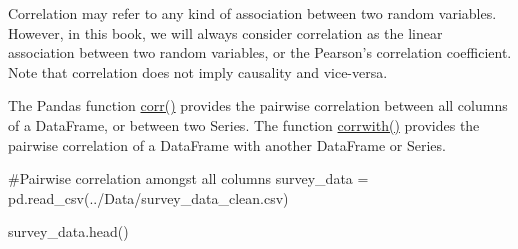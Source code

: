 \documentclass[
  letterpaper,
  DIV=11,
  numbers=noendperiod]{scrreprt}
\newenvironment{Shaded}{\begin{snugshade}}{\end{snugshade}}
\newcommand{\CommentTok}[1]{\textcolor[rgb]{0.37,0.37,0.37}{#1}}
\newcommand{\NormalTok}[1]{\textcolor[rgb]{0.00,0.23,0.31}{#1}}
\newcommand{\OperatorTok}[1]{\textcolor[rgb]{0.37,0.37,0.37}{#1}}
\newcommand{\StringTok}[1]{\textcolor[rgb]{0.13,0.47,0.30}{#1}}
\begin{document}
Correlation may refer to any kind of association between two random
variables. However, in this book, we will always consider correlation as
the linear association between two random variables, or the Pearson's
correlation coefficient. Note that correlation does not imply causality
and vice-versa.

The Pandas function
\href{https://pandas.pydata.org/docs/reference/api/pandas.DataFrame.corr.html}{corr()}
provides the pairwise correlation between all columns of a DataFrame, or
between two Series. The function
\href{https://pandas.pydata.org/docs/reference/api/pandas.DataFrame.corrwith.html\#pandas.DataFrame.corrwith}{corrwith()}
provides the pairwise correlation of a DataFrame with another DataFrame
or Series.

\begin{Shaded}
\begin{Highlighting}[]
\CommentTok{\#Pairwise correlation amongst all columns}
\NormalTok{survey\_data }\OperatorTok{=}\NormalTok{ pd.read\_csv(}\StringTok{\textquotesingle{}../Data/survey\_data\_clean.csv\textquotesingle{}}\NormalTok{)}

\NormalTok{survey\_data.head()}
\end{Highlighting}
\end{Shaded}
\end{document}
